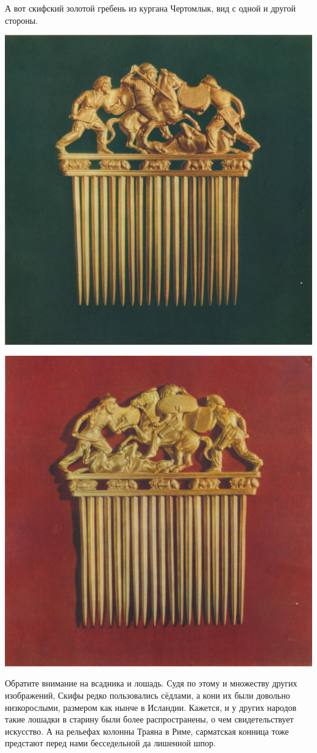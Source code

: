 А вот скифский золотой гребень из кургана Чертомлык, вид с одной и другой стороны.

\begin{center}
\includegraphics[width=0.75\linewidth]{chast-colebanie-osnov/alani/greben01.jpg}
\end{center}


\begin{center}
\includegraphics[width=0.75\linewidth]{chast-colebanie-osnov/alani/greben02.jpg}
\end{center}

Обратите внимание на всадника и лошадь. Судя по этому и множеству других изображений, Скифы редко пользовались сёдлами, а кони их были довольно низкорослыми, размером как нынче в Исландии. Кажется, и у других народов такие лошадки в старину были более распространены, о чем свидетельствует искусство. А на рельефах колонны Траяна в Риме, сарматская конница тоже предстают перед нами бесседельной да лишенной шпор.

